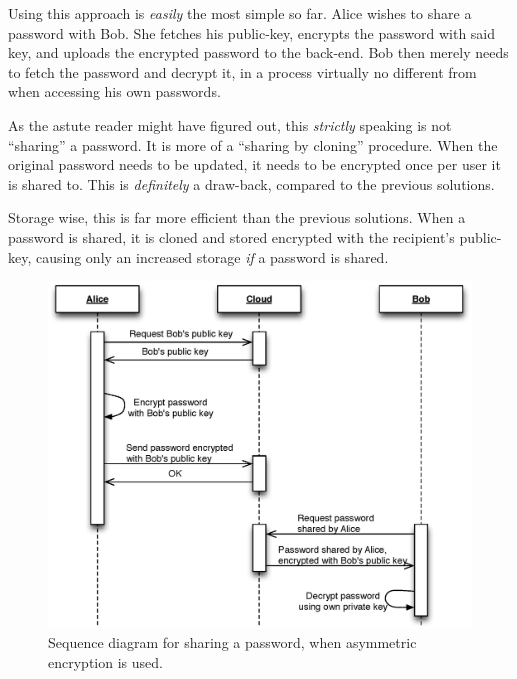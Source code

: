 				Using this approach is \emph{easily} the most simple so far. Alice wishes to share a password with Bob. She fetches his public-key, encrypts the password with said key, and uploads the encrypted password to the back-end. Bob then merely needs to fetch the password and decrypt it, in a process virtually no different from when accessing his own passwords.

				As the astute reader might have figured out, this \emph{strictly} speaking is not ``sharing'' a password. It is more of a ``sharing by cloning'' procedure. When the original password needs to be updated, it needs to be encrypted once per user it is shared to. This is \emph{definitely} a draw-back, compared to the previous solutions. 

				Storage wise, this is far more efficient than the previous solutions. When a password is shared, it is cloned and stored encrypted with the recipient's public-key, causing only an increased storage \emph{if} a password is shared.

				\begin{figure}[h!]
					\centering
					\includegraphics[width=\textwidth]{figures/design/uml/sequence/sharing-asymmetric.eps}
					\caption{Sequence diagram for sharing a password, when asymmetric encryption is used.}
					\label{fig:sequence:asymmetric}
				\end{figure}




